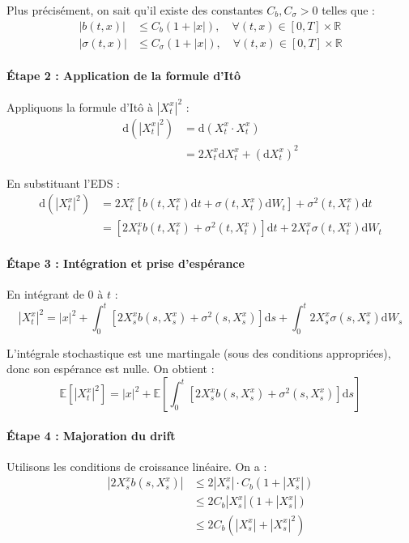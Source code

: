 \documentclass[12pt,a4paper]{article}
\theoremstyle{definition}
\theoremstyle{remark}
\newcommand{\R}{\mathbb{R}}
\newcommand{\E}{\mathbb{E}}
\newcommand{\dd}{\mathrm{d}}
\begin{document}
Plus précisément, on sait qu'il existe des constantes $C_b, C_\sigma > 0$ telles que :
\begin{align}
|b(t,x)| &\leq C_b(1 + |x|), \quad \forall (t,x) \in [0,T] \times \R \\
|\sigma(t,x)| &\leq C_\sigma(1 + |x|), \quad \forall (t,x) \in [0,T] \times \R
\end{align}

\paragraph{Étape 2 : Application de la formule d'Itô}
Appliquons la formule d'Itô à $|X_t^x|^2$ :
\begin{align*}
\dd(|X_t^x|^2) &= \dd(X_t^x \cdot X_t^x) \\
&= 2X_t^x \dd X_t^x + (\dd X_t^x)^2
\end{align*}

En substituant l'EDS :
\begin{align*}
\dd(|X_t^x|^2) &= 2X_t^x[b(t,X_t^x)\dd t + \sigma(t,X_t^x)\dd W_t] + \sigma^2(t,X_t^x)\dd t \\
&= [2X_t^x b(t,X_t^x) + \sigma^2(t,X_t^x)]\dd t + 2X_t^x\sigma(t,X_t^x)\dd W_t
\end{align*}

\paragraph{Étape 3 : Intégration et prise d'espérance}
En intégrant de $0$ à $t$ :
\[
|X_t^x|^2 = |x|^2 + \int_0^t [2X_s^x b(s,X_s^x) + \sigma^2(s,X_s^x)]\dd s + \int_0^t 2X_s^x\sigma(s,X_s^x)\dd W_s
\]

L'intégrale stochastique est une martingale (sous des conditions appropriées), donc son espérance est nulle. On obtient :
\[
\E[|X_t^x|^2] = |x|^2 + \E\left[\int_0^t [2X_s^x b(s,X_s^x) + \sigma^2(s,X_s^x)]\dd s\right]
\]

\paragraph{Étape 4 : Majoration du drift}
Utilisons les conditions de croissance linéaire. On a :
\begin{align*}
|2X_s^x b(s,X_s^x)| &\leq 2|X_s^x| \cdot C_b(1 + |X_s^x|) \\
&\leq 2C_b|X_s^x|(1 + |X_s^x|) \\
&\leq 2C_b(|X_s^x| + |X_s^x|^2)
\end{align*}
\end{document}
